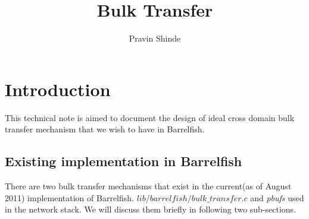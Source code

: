 \documentclass[a4paper,twoside]{report} %
\title{Bulk Transfer}   %
\author{Pravin Shinde} %
\begin{document}
\maketitle

%
%
\begin{versionhistory}
\end{versionhistory}


\chapter{Introduction}
This technical note is aimed to document the design of ideal cross domain bulk
transfer mechanism that we wish to have in Barrelfish.


\section{Existing implementation in Barrelfish}
There are two bulk transfer mechanisms that exist in the current(as of August
2011) implementation of Barrelfish.
\texttt{$lib/barrelfish/bulk\_transfer.c$}
and \textit{pbufs} used in the network stack.  We will discuss them briefly in
following two sub-sections.
\end{document}
